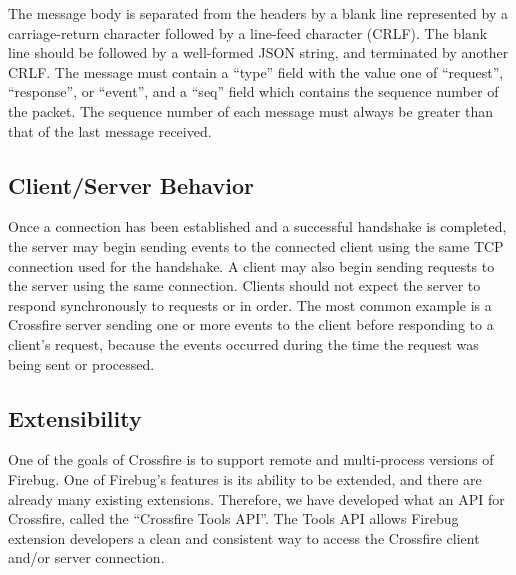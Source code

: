 The message body is separated from the headers by a blank line
represented by a carriage-return character followed by a line-feed
character (CRLF).
The blank line should be followed by a well-formed JSON string, and terminated
by another CRLF. The message must contain a ``type'' field with the value one of
``request'', ``response'', or ``event'', and a ``seq'' field which contains the
sequence number of the packet. The sequence number of each message must always
be greater than that of the last message received.

\subsection {Client/Server Behavior}
Once a connection has been established and a successful handshake is completed,
the server may begin sending events to the connected client using the same TCP
connection used for the handshake. A client may also begin sending requests to
the server using the same connection. Clients should not expect the server to
respond synchronously to requests or in order. The most common example is a
Crossfire server sending one or more events to the client before responding to a
client's request, because the events occurred during the time the request was
being sent or processed.

\subsection {Extensibility}
One of the goals of Crossfire is to support remote and multi-process versions of
Firebug. One of Firebug's features is its ability to be extended, and there are
already many existing extensions. Therefore, we have developed what an API for
Crossfire, called the ``Crossfire Tools API''. The Tools API allows Firebug
extension developers a clean and consistent way to access the Crossfire client
and/or server connection.

